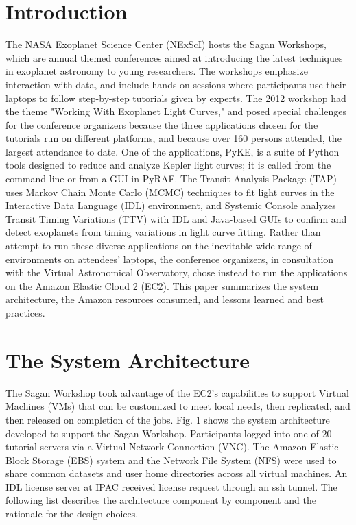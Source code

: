 \section{Introduction}
The NASA Exoplanet Science Center (NExScI) hosts the Sagan Workshops, which are annual themed conferences aimed at introducing the latest techniques in exoplanet astronomy to young researchers. The workshops emphasize interaction with data, and include hands-on sessions where participants use their laptops to follow step-by-step tutorials given by experts.  The 2012 workshop had the theme "Working With Exoplanet Light Curves," and posed special challenges for the conference organizers because the  three applications chosen for the tutorials run on different platforms, and because over 160 persons attended,  the largest attendance to date. One of the applications, PyKE, 
is a suite of Python tools designed to reduce and analyze Kepler light curves; it is called from the command line or from a GUI in PyRAF. The Transit Analysis Package (TAP) uses Markov Chain Monte Carlo (MCMC) techniques to fit light curves in the Interactive Data Language (IDL) environment, and Systemic Console analyzes Transit Timing Variations (TTV) with IDL and Java-based GUIs to confirm and detect exoplanets from timing variations in light curve fitting.  Rather than attempt to run these diverse applications on the inevitable wide range of environments on attendees' laptops, the conference organizers, in consultation with the Virtual Astronomical Observatory, chose instead to run the applications on the Amazon Elastic Cloud 2 (EC2). This paper summarizes the system architecture, the Amazon resources consumed, and lessons learned and best practices.

\section{The System Architecture}

The Sagan Workshop took advantage of the EC2's capabilities to support Virtual Machines (VMs) that can be customized to meet local needs, then replicated, and then released on completion of the jobs. Fig. 1 shows the system architecture developed to support the Sagan Workshop. Participants logged into one of 20 tutorial servers via a Virtual Network Connection (VNC). The Amazon Elastic Block Storage (EBS) system and the Network File System (NFS) were used to share common datasets and user home directories across all virtual machines. An IDL license server at IPAC received license request through an ssh tunnel. The following list describes the architecture component by component and the rationale for the design choices.


